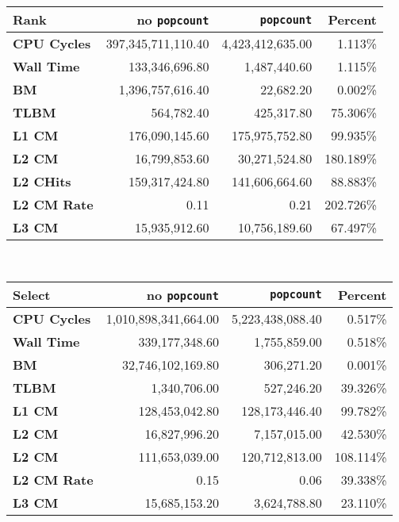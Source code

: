 \begin{tabular}{|l|r|r|r|}
\hline
\textbf{Rank} & no \texttt{popcount} & \texttt{popcount} & Percent \\ \hline
\textbf{CPU Cycles} & 397,345,711,110.40 & 4,423,412,635.00 & 1.113\% \\ \hline
\textbf{Wall Time} & 133,346,696.80 & 1,487,440.60 & 1.115\% \\ \hline
\textbf{BM} & 1,396,757,616.40 & 22,682.20 & 0.002\% \\ \hline
\textbf{TLBM} & 564,782.40 & 425,317.80 & 75.306\% \\ \hline
\textbf{L1 CM} & 176,090,145.60 & 175,975,752.80 & 99.935\% \\ \hline
\textbf{L2 CM} & 16,799,853.60 & 30,271,524.80 & 180.189\% \\ \hline
\textbf{L2 CHits} & 159,317,424.80 & 141,606,664.60 & 88.883\% \\ \hline
\textbf{L2 CM Rate} & 0.11 & 0.21 & 202.726\% \\ \hline
\textbf{L3 CM} & 15,935,912.60 & 10,756,189.60 & 67.497\% \\ \hline
\end{tabular}\\[5pt]
\begin{tabular}{|l|r|r|r|}
\hline
\textbf{Select} & no \texttt{popcount} & \texttt{popcount} & Percent \\ \hline
\textbf{CPU Cycles} & 1,010,898,341,664.00 & 5,223,438,088.40 & 0.517\% \\ \hline
\textbf{Wall Time} & 339,177,348.60 & 1,755,859.00 & 0.518\% \\ \hline
\textbf{BM} & 32,746,102,169.80 & 306,271.20 & 0.001\% \\ \hline
\textbf{TLBM} & 1,340,706.00 & 527,246.20 & 39.326\% \\ \hline
\textbf{L1 CM} & 128,453,042.80 & 128,173,446.40 & 99.782\% \\ \hline
\textbf{L2 CM} & 16,827,996.20 & 7,157,015.00 & 42.530\% \\ \hline
\textbf{L2 CM} & 111,653,039.00 & 120,712,813.00 & 108.114\% \\ \hline
\textbf{L2 CM Rate} & 0.15 & 0.06 & 39.338\% \\ \hline
\textbf{L3 CM} & 15,685,153.20 & 3,624,788.80 & 23.110\% \\ \hline
\end{tabular}\\[5pt]

